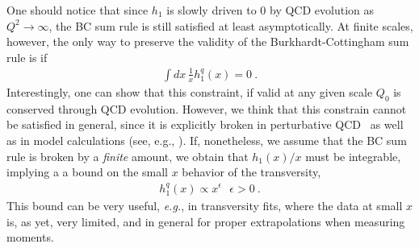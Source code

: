 \documentclass[preprintnumbers,floatfix,nofootinbib]{revtex4}
\newcommand{\eg}{{\em e.g.}}
\begin{document}
One should notice that since $h_1$ is slowly driven to 0 by QCD evolution as $Q^2 \to \infty$, the BC sum rule is still satisfied at least
asymptotically.
At finite scales, however, the only way to preserve the validity of the
Burkhardt-Cottingham sum rule is if
\begin{align}
   \int dx\, \frac{1}{x} h_1^q(x) = 0 \ .
\label{eq:ABsumrule}
\end{align}
Interestingly, one can show that this constraint, if valid at any given scale
$Q_0$ is conserved through QCD evolution. However, we think that this
constrain cannot be satisfied in general, since it is explicitly broken in perturbative
QCD~\cite{Kundu:2001pk} as well as in model calculations (see, e.g., \cite{Schweitzer:2001sr,Wakamatsu:2007nc,Pasquini:2005dk,Cloet:2007em,Bacchetta:2008af,Bourrely:2010ng}). If, nonetheless,  we assume that the BC sum rule is broken by a {\em finite} amount, we
obtain that $h_1(x)/x$ must be integrable, implying a 
a bound on the small $x$ behavior of the transversity, 
\begin{align}
  h_1^q(x) \propto x^\epsilon \ \ \ \epsilon>0 \ .
\label{eq:ABbound}
\end{align}
This bound can be very useful, \eg, in transversity fits, where the data at
small $x$ is, as yet, very limited, and in general for proper extrapolations
when measuring moments. 
\end{document}
